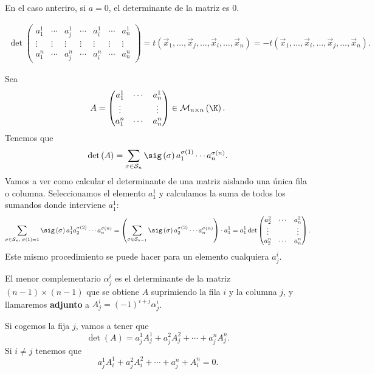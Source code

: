 \begin{observation}
\normalfont En el caso anteriro, si $\displaystyle a = 0 $, el determinante de la matriz es 0.
\end{observation}

\begin{observation}
\normalfont 
\[
\begin{split}
	\det\begin{pmatrix} a^{1}_{1} & \cdots & a^{1}_{j} & \cdots & a^{1}_{i} & \cdots & a^{1}_{n}\\
	\vdots & \vdots & \vdots & \vdots & \vdots & \vdots & \vdots \\
a^{n}_{1} & \cdots & a^{n}_{j} & \cdots & a^{n}_{i} & \cdots & a^{n}_{n}\end{pmatrix} = t\left(\vec{x}_{1}, \ldots, \vec{x}_{j}, \ldots, \vec{x}_{i}, \ldots, \vec{x}_{n}\right) = - t\left(\vec{x}_{1}, \ldots, \vec{x}_{i}, \ldots, \vec{x}_{j}, \ldots, \vec{x}_{n}\right) .
\end{split}
\]
\end{observation}

Sea 
\[A = \begin{pmatrix} a^{1}_{1} & \cdots & a^{1}_{n}\\
\vdots & & \vdots \\
a^{n}_{1} & \cdots & a^{n}_{n}\end{pmatrix} \in \mathcal{M}_{n \times n}\left(\K\right) .\]
Tenemos que 
\[\det\left(A\right) = \sum_{\sigma \in \mathcal{S}_{n}} \sig\left(\sigma \right)a_{1}^{\sigma\left(1\right)}\cdots a^{\sigma\left(n\right)}_{n}.\]
Vamos a ver como calcular el determinante de una matriz aislando una única fila o columna. Seleccionamos el elemento $\displaystyle a_{1}^{1} $ y calculamos la suma de todos los sumandos donde interviene $\displaystyle a^{1}_{1} $:
\[ \sum_{\sigma \in \mathcal{S}_{n}, \; \sigma\left(1\right) = 1} \sig\left(\sigma \right)a^{1}_{1}a^{\sigma\left(2\right)}_{2} \cdots a^{\sigma\left(n\right)}_{n} = \left(\sum_{\sigma \in \mathcal{S}_{n-1}}\sig\left(\sigma \right)a^{\sigma\left(2\right)}_{2} \cdots a^{\sigma\left(n\right)}_{n}\right) \cdot a_{1}^{1} = a^{1}_{1} \det \begin{pmatrix} a^{2}_{2} & \cdots & a^{2}_{n}\\
\vdots & & \vdots \\
a^{n}_{2} & \cdots & a^{n}_{n}\end{pmatrix}.\]
Este mismo procedimiento se puede hacer para un elemento cualquiera $\displaystyle a^{i}_{j} $.
\begin{fdefinition}[Adjunto]
\normalfont  El menor complementario $\displaystyle \alpha^{i}_{j} $ es el determinante de la matriz $\displaystyle \left(n - 1\right) \times \left(n - 1\right) $ que se obtiene $\displaystyle A $ suprimiendo la fila $\displaystyle i $ y la columna $\displaystyle j $, y llamaremos \textbf{adjunto} a $\displaystyle A^{i}_{j} = \left(-1\right)^{i+j}\alpha^{i}_{j} $. 
\end{fdefinition}

Si cogemos la fija $\displaystyle j $, vamos a tener que 
\[\det\left(A\right) = a^{1}_{j}A^{1}_{j}+a^{2}_{j}A^{2}_{j}+\cdots+a^{n}_{j}A^{n}_{j} .\]
Si $\displaystyle i\neq j $ tenemos que
\[a^{1}_{j}A^{1}_{i} + a^{2}_{j}A^{2}_{i} + \cdots + a^{n}_{j}+A^{n}_{i} = 0 .\]


